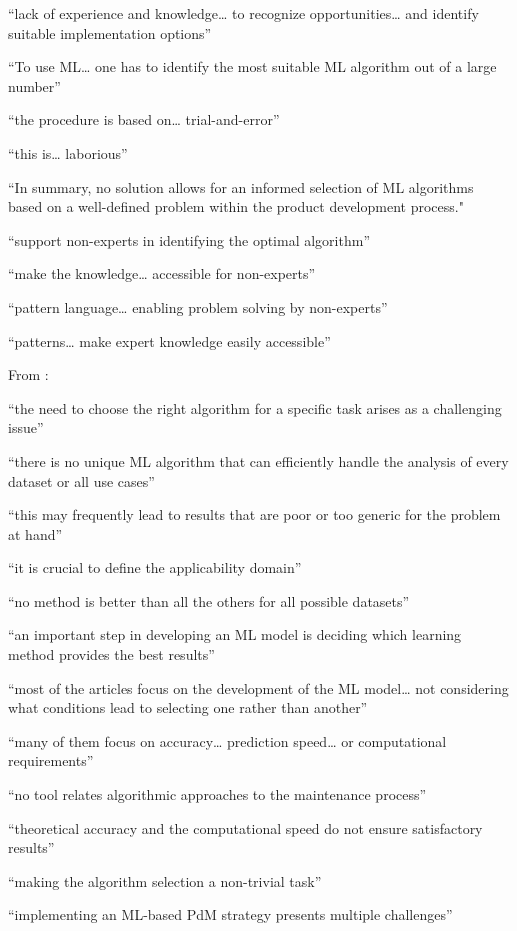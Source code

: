 “lack of experience and knowledge… to recognize opportunities… and identify suitable implementation options”

“To use ML… one has to identify the most suitable ML algorithm out of a large number”

“the procedure is based on… trial-and-error”

“this is… laborious”

“In summary, no solution allows for an informed selection of ML algorithms based on a well-defined
problem within the product development process."

“support non-experts in identifying the optimal algorithm”

“make the knowledge… accessible for non-experts”

“pattern language… enabling problem solving by non-experts”

“patterns… make expert knowledge easily accessible”

From \parencite{arena2024conceptual_framework_ml_algorithm_selection_predictive_maintenance} :

“the need to choose the right algorithm for a specific task arises as a challenging issue”

“there is no unique ML algorithm that can efficiently handle the analysis of every dataset or all use cases”

“this may frequently lead to results that are poor or too generic for the problem at hand”

“it is crucial to define the applicability domain”

“no method is better than all the others for all possible datasets”

“an important step in developing an ML model is deciding which learning method provides the best results”

“most of the articles focus on the development of the ML model… not considering what conditions lead to selecting one rather than another”

“many of them focus on accuracy… prediction speed… or computational requirements”

“no tool relates algorithmic approaches to the maintenance process”

“theoretical accuracy and the computational speed do not ensure satisfactory results”

“making the algorithm selection a non-trivial task”

“implementing an ML-based PdM strategy presents multiple challenges”

